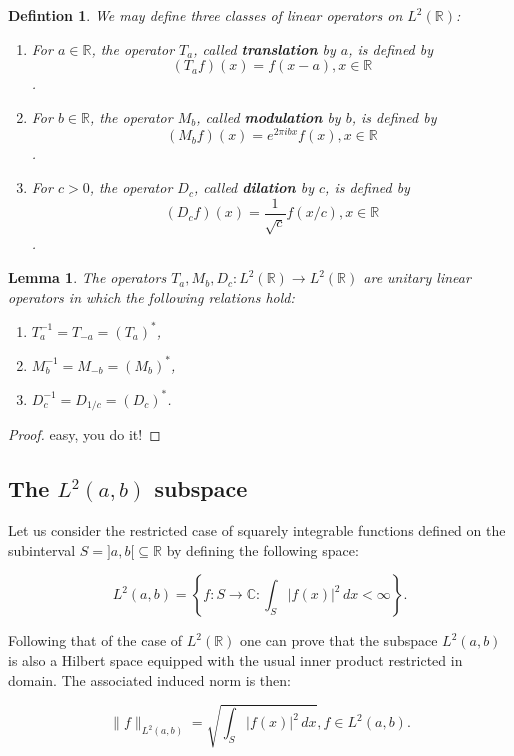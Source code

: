 \documentclass{article}
\newtheorem{defn}{Defintion}[section]
\newtheorem{lem}[thm]{Lemma}
\begin{document}
\begin{defn}
We may define three classes of linear operators on $L^2(\mathbb{R})$:
\begin{enumerate}
\item For $a\in\mathbb{R}$, the operator $T_a$, called \textbf{translation} by
      $a$, is defined by \[(T_a f)(x) = f(x-a), x\in\mathbb{R}\].
\item For $b\in\mathbb{R}$, the operator $M_b$, called \textbf{modulation} by
      $b$, is defined by \[(M_b f)(x) = e^{2\pi i b x} f(x), x\in\mathbb{R}\].
\item For $c>0$, the operator $D_c$, called \textbf{dilation} by $c$, is defined
      by \[(D_c f)(x) = \frac{1}{\sqrt{c}} f(x/c), x\in\mathbb{R}\].
\end{enumerate}
\end{defn}

\begin{lem}
The operators $T_a,M_b,D_c : L^2(\mathbb{R}) \to L^2(\mathbb{R})$ are unitary
linear operators in which the following relations hold:
\begin{enumerate}
\item $T_a^{-1} = T_{-a} = (T_a)^{*}$,
\item $M_b^{-1} = M_{-b} = (M_b)^{*}$,
\item $D_c^{-1} = D_{1/c} = (D_c)^{*}$.
\end{enumerate}
\end{lem}

\begin{proof}
easy, you do it!
\end{proof}

\subsection{The $L^2(a,b)$ subspace}

Let us consider the restricted case of squarely integrable functions defined on
the subinterval $S=]a,b[\subseteq\mathbb{R}$ by defining the following space:

\[
  L^2(a,b) = \left\{ f : S \to \mathbb{C} : \int_S |f(x)|^2 \, dx < \infty \right\}.
\]

Following that of the case of $L^2(\mathbb{R})$ one can prove that the subspace
$L^2(a,b)$ is also a Hilbert space equipped with the usual inner product
restricted in domain. The associated induced norm is then:

\[
  \|f\|_{L^2(a,b)} = \sqrt{\int_S |f(x)|^2 \, dx}, f \in L^2(a,b).
\]
\end{document}

